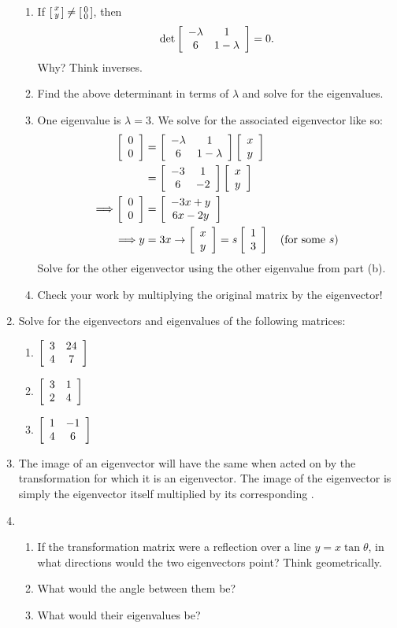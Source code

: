 \documentclass[../gatm.tex]{subfiles}
\begin{document}
\begin{enumerate}
\begin{enumerate}
\item If $\left[\begin{smallmatrix} x \\ y \end{smallmatrix}\right]\neq \left[\begin{smallmatrix} 0 \\ 0 \end{smallmatrix}\right]$, then $$\det \left[\begin{array}{cc} -\lambda & 1 \\ 6 & 1-\lambda \end{array}\right]=0.$$ Why? Think inverses.
\item Find the above determinant in terms of $\lambda$ and solve for the eigenvalues.
\item One eigenvalue is $\lambda=3$. We solve for the associated eigenvector like so:
\begin{align*}
\left[\begin{array}{c} 0 \\ 0 \end{array}\right] &= \left[\begin{array}{cc} -\lambda & 1 \\ 6 & 1-\lambda \end{array}\right]\left[\begin{array}{c} x \\ y \end{array}\right] \\
&= \left[\begin{array}{cc} -3 & 1 \\ 6 & -2 \end{array}\right]\left[\begin{array}{c} x \\ y \end{array}\right] \\
\Longrightarrow \left[\begin{array}{c} 0 \\ 0 \end{array}\right] &= \left[\begin{array}{c} -3x+y \\ 6x-2y \end{array}\right] \\
\Longrightarrow y&=3x \rightarrow \left[\begin{array}{c} x \\ y \end{array}\right]=s\left[\begin{array}{c} 1 \\ 3 \end{array}\right]\quad \text{(for some }s\text{)}
\end{align*}
Solve for the other eigenvector using the other eigenvalue from part (b).
\item Check your work by multiplying the original matrix by the eigenvector!
\end{enumerate}
\item Solve for the eigenvectors and eigenvalues of the following matrices:
\begin{multicols}{3}
\begin{enumerate}
\item $\left[\begin{array}{cc} 3 & 24 \\ 4 & 7 \end{array}\right]$
\item $\left[\begin{array}{cc} 3 & 1 \\ 2 & 4 \end{array}\right]$
\item $\left[\begin{array}{cc} 1 & -1 \\ 4 & 6 \end{array}\right]$
\end{enumerate}
\end{multicols}
\item The image of an eigenvector will have the same \underline{\phantom{direction}} when acted on by the transformation \underline{\phantom{matrix}} for which it is an eigenvector. The image of the eigenvector is simply the eigenvector itself multiplied by its corresponding \underline{\phantom{eigenvalue}}.
\item \begin{enumerate}
\item If the transformation matrix were a reflection over a line $y=x\tan\theta$, in what directions would the two eigenvectors point? Think geometrically.
\item What would the angle between them be?
\item What would their eigenvalues be?
\end{enumerate}

\end{enumerate}
\end{document}
